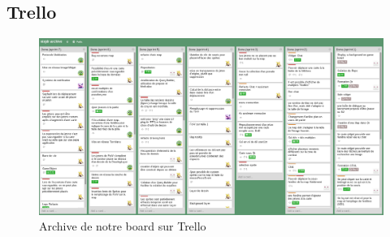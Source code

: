 \subsection{Trello}

\begin{figure}[h!]
	\centering
	\includegraphics[width=1\textwidth]{img/trello_archive.png}
	\caption{Archive de notre board sur Trello}
\end{figure}